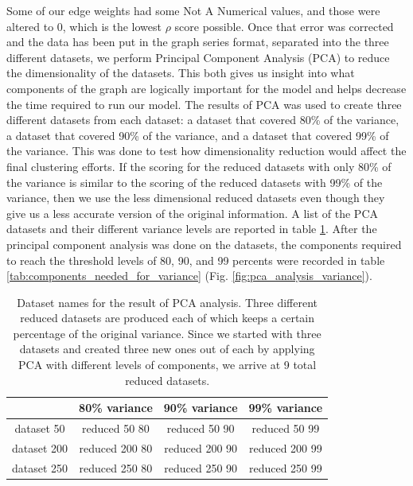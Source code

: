 \documentclass[journal,12pt,onecolumn,draftclsnofoot]{IEEEtran}  %
\begin{document}
Some of our edge weights had some Not A Numerical values, and those were altered to 0, which is the lowest $\rho$ score possible. Once that error was corrected and the data has been put in the graph series format, separated into the three different datasets, we perform Principal Component Analysis (PCA) to reduce the dimensionality of the datasets. This both gives us insight into what components of the graph are logically important for the model and helps decrease the time required to run our model. The results of PCA was used to create three different datasets from each dataset: a dataset that covered 80\% of the variance, a dataset that covered 90\% of the variance, and a dataset that covered 99\% of the variance. This was done to test how dimensionality reduction would affect the final clustering efforts. If the scoring for the reduced datasets with only 80\% of the variance is similar to the scoring of the reduced datasets with 99\% of the variance, then we use the less dimensional reduced datasets even though they give us a less accurate version of the original information. A list of the PCA datasets and their different variance levels are reported in table \ref{tab:pca_datasets}. After the principal component analysis was done on the datasets, the components required to reach the threshold levels of 80, 90, and 99 percents were recorded in table \ref{tab:components_needed_for_variance} (Fig. \ref{fig:pca_analysis_variance}).


\begin{table}[H]
\centering
\caption{Dataset names for the result of PCA analysis. Three different reduced datasets are produced each of which keeps a certain percentage of the original variance. Since we started with three datasets and created three new ones out of each by applying PCA with different levels of components, we arrive at 9 total reduced datasets.}
\label{tab:pca_datasets}
\begin{tabular}{|c|c|c|c|}
\hline
  &  80\% variance &  90\% variance & 99\% variance \\ \hline
 
dataset 50 & reduced 50 80 & reduced 50 90 & reduced 50 99  \\ \hline
dataset 200 & reduced 200 80 & reduced 200 90 & reduced 200 99  \\ \hline
dataset 250 & reduced 250 80 & reduced 250 90 & reduced 250 99  \\ \hline
\end{tabular}
\end{table}
\end{document}
